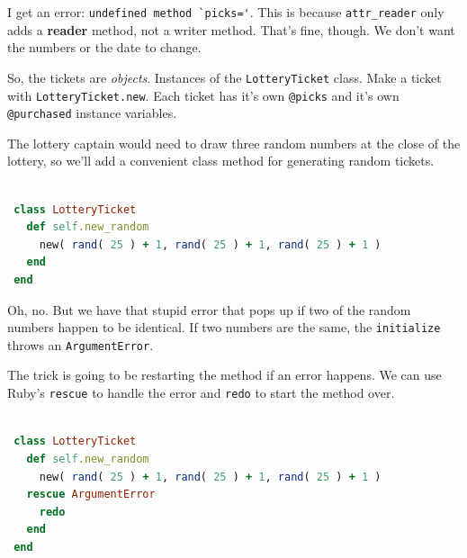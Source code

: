 \documentclass[10pt,twoside]{report}
\begin{document}
I get an error: 
\lstinline[breaklines=true]|undefined method `picks='|. 
This is because \lstinline[breaklines=true]|attr_reader|
only adds a {\bf reader} method, not a writer method. That's fine,
though.  We don't want the numbers or the date to change.

So, the tickets are {\em objects}.  Instances of the
\lstinline[breaklines=true]|LotteryTicket| class.  Make a ticket with
\lstinline[breaklines=true]|LotteryTicket.new|.  Each ticket has it's
own \lstinline[breaklines=true]|@picks| and it's own
\lstinline[breaklines=true]|@purchased| instance variables.

The lottery captain would need to draw three random numbers at the
close of the lottery, so we'll add a convenient class method for
generating random tickets.


\begin{lstlisting}[basicstyle=\ttfamily\color{basiccolor},
    commentstyle = \ttfamily\color{commentcolor},
    keywordstyle=\ttfamily\color{keywordscolor},
    stringstyle=\color{stringcolor},
    language=Ruby,
    basicstyle=\small\ttfamily,
    showstringspaces=false,
  ]

 class LotteryTicket
   def self.new_random
     new( rand( 25 ) + 1, rand( 25 ) + 1, rand( 25 ) + 1 )
   end
 end

\end{lstlisting}


Oh, no.  But we have that stupid error that pops up if two of the
random numbers happen to be identical.  If two numbers are the same,
the \lstinline[breaklines=true]|initialize| throws an
\lstinline[breaklines=true]|ArgumentError|.

The trick is going to be restarting the method if an error happens. We
can use Ruby's \lstinline[breaklines=true]|rescue| to handle the error
and \lstinline[breaklines=true]|redo| to start the method over.


\begin{lstlisting}[basicstyle=\ttfamily\color{basiccolor},
    commentstyle = \ttfamily\color{commentcolor},
    keywordstyle=\ttfamily\color{keywordscolor},
    stringstyle=\color{stringcolor},
    language=Ruby,
    basicstyle=\small\ttfamily,
    showstringspaces=false,
  ]

 class LotteryTicket
   def self.new_random
     new( rand( 25 ) + 1, rand( 25 ) + 1, rand( 25 ) + 1 )
   rescue ArgumentError
     redo
   end
 end

\end{lstlisting}
\end{document}
